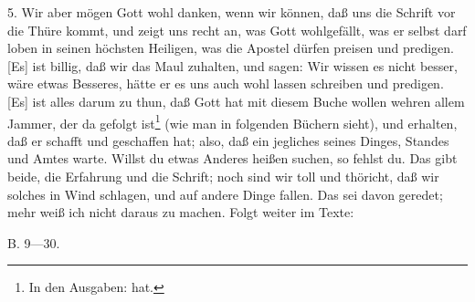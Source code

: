 5. Wir aber mögen Gott wohl danken, wenn wir können, daß uns die Schrift vor die Thüre kommt, und zeigt uns recht an, was Gott wohlgefällt, was er selbst darf loben in seinen höchsten Heiligen, was die Apostel dürfen preisen und predigen. [Es] ist billig, daß wir das Maul zuhalten, und sagen: Wir wissen es nicht besser, wäre etwas Besseres, hätte er es uns auch wohl lassen schreiben und predigen. [Es] ist alles darum zu thun, daß Gott hat mit diesem Buche wollen wehren allem Jammer, der da gefolgt ist\footnote{In den Ausgaben: hat.} (wie man in folgenden Büchern sieht), und erhalten, daß er schafft und geschaffen hat; also, daß ein jegliches seines Dinges, Standes und Amtes warte. Willst du etwas Anderes heißen suchen, so fehlst du. Das gibt beide, die Erfahrung und die Schrift; noch sind wir toll und thöricht, daß wir solches in Wind schlagen, und auf andere Dinge fallen. Das sei davon geredet; mehr weiß ich nicht daraus zu machen. Folgt weiter im Texte:

B. 9—30.

